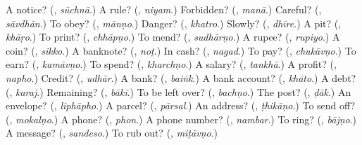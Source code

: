 \begin{tcolorbox}[breakable,colback=teal!4,colframe=teal!35!black,title={Before you move on}]
A notice? (\textbf{}, \emph{sūchnā}.) A rule? (\textbf{}, \emph{niyam}.) Forbidden? (\textbf{}, \emph{manā}.) Careful? (\textbf{}, \emph{sāvdhān}.) To obey? (\textbf{}, \emph{mānṇo}.) Danger? (\textbf{}, \emph{khatro}.) Slowly? (\textbf{}, \emph{dhīre}.) A pit? (\textbf{}, \emph{khāṛo}.) To print? (\textbf{}, \emph{chhāpṇo}.) To mend? (\textbf{}, \emph{sudhārṇo}.) A rupee? (\textbf{}, \emph{rupiyo}.) A coin? (\textbf{}, \emph{sikko}.) A banknote? (\textbf{}, \emph{noṭ}.) In cash? (\textbf{}, \emph{nagad}.) To pay? (\textbf{}, \emph{chukāvṇo}.) To earn? (\textbf{}, \emph{kamāvṇo}.) To spend? (\textbf{}, \emph{kharchṇo}.) A salary? (\textbf{}, \emph{tankhā}.) A profit? (\textbf{}, \emph{napho}.) Credit? (\textbf{}, \emph{udhār}.) A bank? (\textbf{}, \emph{baiṅk}.) A bank account? (\textbf{}, \emph{khāto}.) A debt? (\textbf{}, \emph{karaj}.) Remaining? (\textbf{}, \emph{bākī}.) To be left over? (\textbf{}, \emph{bachṇo}.) The post? (\textbf{}, \emph{ḍāk}.) An envelope? (\textbf{}, \emph{liphāpho}.) A parcel? (\textbf{}, \emph{pārsal}.) An address? (\textbf{}, \emph{ṭhikāṇo}.) To send off? (\textbf{}, \emph{mokalṇo}.) A phone? (\textbf{}, \emph{phon}.) A phone number? (\textbf{}, \emph{nambar}.) To ring? (\textbf{}, \emph{bājṇo}.) A message? (\textbf{}, \emph{sandeso}.) To rub out? (\textbf{}, \emph{miṭāvṇo}.)
\end{tcolorbox}
